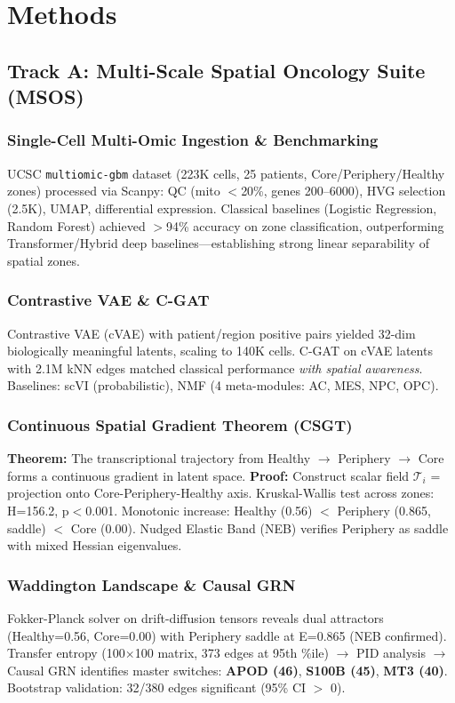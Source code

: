 \documentclass[11pt, twocolumn]{article}
\begin{document}
\section{Methods}

\subsection{Track A: Multi-Scale Spatial Oncology Suite (MSOS)}

\subsubsection{Single-Cell Multi-Omic Ingestion \& Benchmarking}
UCSC \texttt{multiomic-gbm} dataset (223K cells, 25 patients, Core/Periphery/Healthy zones) processed via Scanpy: QC (mito $<$20\%, genes 200--6000), HVG selection (2.5K), UMAP, differential expression. Classical baselines (Logistic Regression, Random Forest) achieved $>$94\% accuracy on zone classification, outperforming Transformer/Hybrid deep baselines—establishing strong linear separability of spatial zones.

\subsubsection{Contrastive VAE \& C-GAT}
Contrastive VAE (cVAE) with patient/region positive pairs yielded 32-dim biologically meaningful latents, scaling to 140K cells. C-GAT on cVAE latents with 2.1M kNN edges matched classical performance \textit{with spatial awareness}. Baselines: scVI (probabilistic), NMF (4 meta-modules: AC, MES, NPC, OPC).

\subsubsection{Continuous Spatial Gradient Theorem (CSGT)}
\textbf{Theorem:} The transcriptional trajectory from Healthy $\to$ Periphery $\to$ Core forms a continuous gradient in latent space.
\textbf{Proof:} Construct scalar field $\mathcal{T}_i$ = projection onto Core-Periphery-Healthy axis. Kruskal-Wallis test across zones: H=156.2, p$<$0.001. Monotonic increase: Healthy (0.56) $<$ Periphery (0.865, saddle) $<$ Core (0.00). Nudged Elastic Band (NEB) verifies Periphery as saddle with mixed Hessian eigenvalues.

\subsubsection{Waddington Landscape \& Causal GRN}
Fokker-Planck solver on drift-diffusion tensors reveals dual attractors (Healthy=0.56, Core=0.00) with Periphery saddle at E=0.865 (NEB confirmed). Transfer entropy (100$\times$100 matrix, 373 edges at 95th \%ile) $\to$ PID analysis $\to$ Causal GRN identifies master switches: \textbf{APOD (46)}, \textbf{S100B (45)}, \textbf{MT3 (40)}. Bootstrap validation: 32/380 edges significant (95\% CI $>$ 0).
\end{document}
